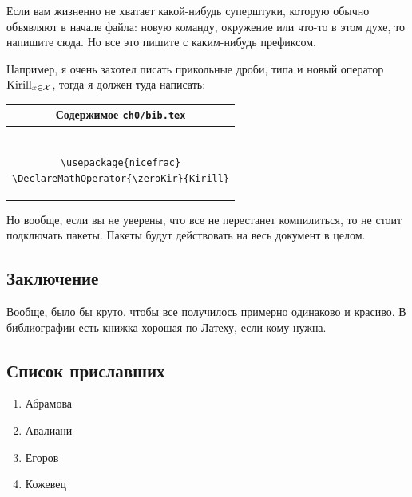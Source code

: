Если вам жизненно не хватает какой-нибудь суперштуки, которую обычно объявляют в начале файла: новую команду, окружение или что-то в этом духе, то напишите сюда. Но все это пишите с каким-нибудь префиксом.

Например, я очень захотел писать прикольные дроби, типа  и новый оператор $\zeroKir\limits_{x\in\SetX}$, тогда я должен туда написать:

\begin{center}
\begin{tabular}{|c|}
\hline
        Содержимое \texttt{ch0/bib.tex}

\\ \hline        
        \begin{minipage}{6in}
                \begin{verbatim}

\usepackage{nicefrac}
\DeclareMathOperator{\zeroKir}{Kirill}
                \end{verbatim}
        \end{minipage}
\\ \hline
\end{tabular}
\end{center}
Но вообще, если вы не уверены, что все не перестанет компилиться, то не стоит подключать пакеты.
Пакеты будут действовать на весь документ в целом.


\subsection{Заключение}

Вообще, было бы круто, чтобы все получилось примерно одинаково и красиво. В библиографии есть книжка хорошая по Латеху, если кому нужна.

\subsection{Список приславших} 

\begin{enumerate}
    \item Абрамова
    \item Авалиани
    \item Егоров
    \item Кожевец
\end{enumerate}